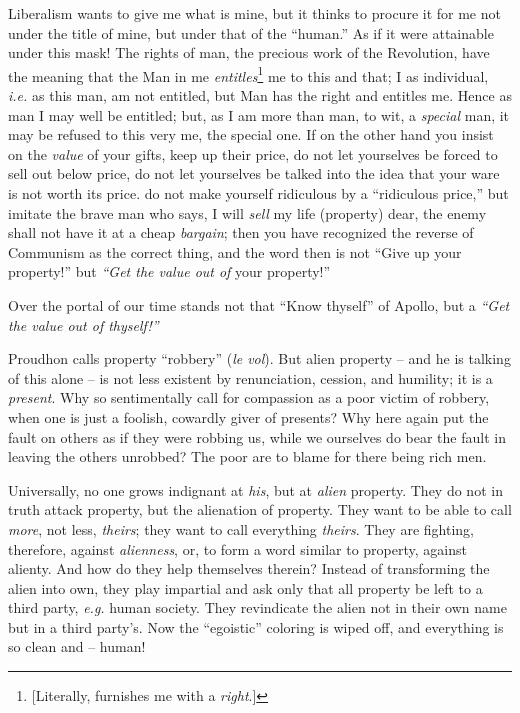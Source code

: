 Liberalism wants to give me what is mine, but it thinks to procure it for me 
not under the title of mine, but under that of the ``human.'' As if it were 
attainable under this mask! The rights of man, the precious work of the 
Revolution, have the meaning that the Man in me 
\textit{entitles}\footnote{[Literally, furnishes me with a \textit{right}.]} 
me to this and that; I as individual, \textit{i.e.} as this man, am not 
entitled, but Man has the right and entitles me. Hence as man I may well be 
entitled; but, as I am more than man, to wit, a \textit{special} man, it may 
be refused to this very me, the special one. If on the other hand you insist 
on the \textit{value} of your gifts, keep up their price, do not let 
yourselves be forced to sell out below price, do not let yourselves be talked 
into the idea that your ware is not worth its price. do not make yourself 
ridiculous by a ``ridiculous price,'' but imitate the brave man who says, I 
will \textit{sell} my life (property) dear, the enemy shall not have it at a 
cheap \textit{bargain}; then you have recognized the reverse of Communism as 
the correct thing, and the word then is not ``Give up your property!'' but 
\textit{``Get the value out of} your property!''

Over the portal of our time stands not that ``Know thyself'' of Apollo, but 
a \textit{``Get the value out of thyself!''}

Proudhon calls property ``robbery'' (\textit{le vol}). But alien property -- 
and he is talking of this alone -- is not less existent by renunciation, 
cession, and humility; it is a \textit{present}. Why so sentimentally call for 
compassion as a poor victim of robbery, when one is just a foolish, cowardly 
giver of presents? Why here again put the fault on others as if they were 
robbing us, while we ourselves do bear the fault in leaving the others 
unrobbed? The poor are to blame for there being rich men.

Universally, no one grows indignant at \textit{his}, but at \textit{alien} 
property. They do not in truth attack property, but the alienation of 
property. They want to be able to call \textit{more}, not less, 
\textit{theirs}; they want to call everything \textit{theirs}. They are 
fighting, therefore, against \textit{alienness}, or, to form a word similar to 
property, against alienty. And how do they help themselves therein? Instead of 
transforming the alien into own, they play impartial and ask only that all 
property be left to a third party, \textit{e.g.} human society. They 
revindicate the alien not in their own name but in a third party's. Now the 
``egoistic'' coloring is wiped off, and everything is so clean and -- human!

